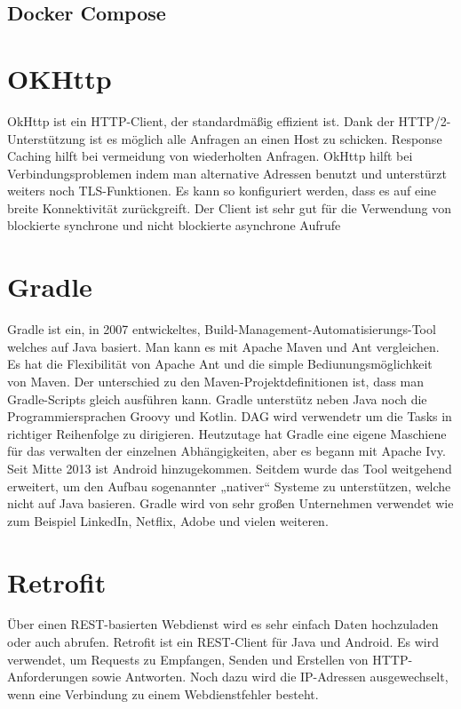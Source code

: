\subsection{Docker Compose}


\section{OKHttp}
\cite{OkHttp}
\author{Bozidar Spasenovic}
OkHttp ist ein HTTP-Client, der standardmäßig effizient ist.
 Dank der HTTP/2-Unterstützung ist es möglich alle Anfragen an einen Host zu schicken. 
Response Caching hilft bei vermeidung von wiederholten Anfragen.
OkHttp hilft bei Verbindungsproblemen indem man alternative Adressen benutzt und unterstürzt weiters noch TLS-Funktionen.
 Es kann so konfiguriert werden, dass es auf eine breite Konnektivität zurückgreift.
 Der Client ist sehr gut für die Verwendung von blockierte synchrone und nicht blockierte asynchrone Aufrufe 

\section{Gradle}
\cite{Gradle1}
\cite{Gradle2}
\author{Bozidar Spasenovic}
Gradle ist ein, in 2007 entwickeltes, Build-Management-Automatisierungs-Tool welches auf Java basiert.
Man kann es mit Apache Maven und Ant vergleichen.
Es hat die Flexibilität von Apache Ant und die simple Bediunungsmöglichkeit von Maven.
Der unterschied zu den  Maven-Projektdefinitionen ist, dass man Gradle-Scripts gleich ausführen kann.
 Gradle unterstütz neben Java noch die Programmiersprachen Groovy und Kotlin.
DAG wird verwendetr um die Tasks in richtiger Reihenfolge zu dirigieren.
Heutzutage hat Gradle eine eigene Maschiene für das verwalten der einzelnen Abhängigkeiten, aber es begann mit Apache Ivy.
Seit Mitte 2013 ist Android hinzugekommen. Seitdem wurde das Tool weitgehend erweitert, um den Aufbau sogenannter „nativer“ Systeme zu unterstützen, welche nicht auf Java basieren.
Gradle wird von sehr großen Unternehmen verwendet wie zum Beispiel LinkedIn, Netflix, Adobe und vielen weiteren.


\section{Retrofit}
\cite{Retrofit}
\author{Bozidar Spasenovic}
Über einen REST-basierten Webdienst wird es sehr einfach Daten hochzuladen oder auch abrufen. 
Retrofit ist ein REST-Client für Java und Android.
Es wird verwendet, um Requests zu Empfangen, Senden und Erstellen von HTTP-Anforderungen sowie Antworten.
Noch dazu wird die IP-Adressen ausgewechselt, wenn eine Verbindung zu einem Webdienstfehler besteht.

